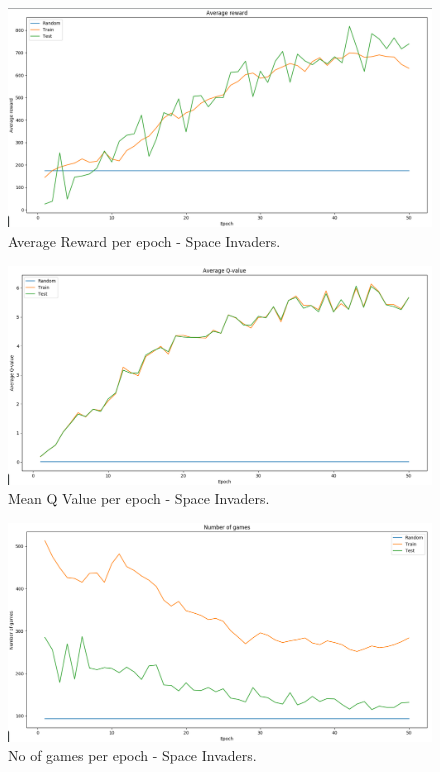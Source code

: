 \documentclass[a4paper,12pt]{report}
\begin{document}
			\begin{figure}[H]
				\begin{centering}
					\includegraphics[width=15cm]{images/space_1_average_reward.png}
					\caption{Average Reward per epoch - Space Invaders.}
				\end{centering}
			\end{figure}			
			
			\begin{figure}[H]
				\begin{centering}
					\includegraphics[width=15cm]{images/space_2_meanq.png}
					\caption{Mean Q Value per epoch - Space Invaders.}
				\end{centering}
			\end{figure}			
			
			\begin{figure}[H]
				\begin{centering}
					\includegraphics[width=15cm]{images/space_3_nrgames.png}
					\caption{No of games per epoch - Space Invaders.}
				\end{centering}
			\end{figure}			
			
\end{document}
